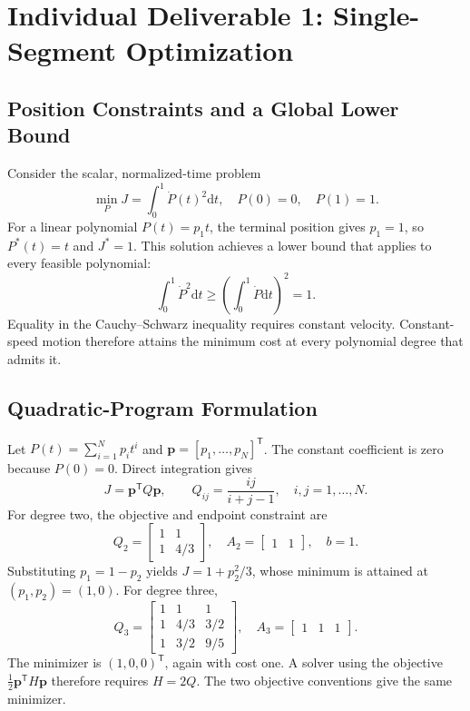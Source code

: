 \documentclass[letterpaper,10pt,conference]{ieeeconf}
\newcommand{\dd}{\mathrm d}
\begin{document}
\section{Individual Deliverable 1: Single-Segment Optimization}
\subsection{Position Constraints and a Global Lower Bound}
Consider the scalar, normalized-time problem
\begin{equation}
\min_P J=\int_0^1\dot P(t)^2\dd t,\quad P(0)=0,\quad P(1)=1.\label{eq:single}
\end{equation}
For a linear polynomial $P(t)=p_1t$, the terminal position gives $p_1=1$, so $P^*(t)=t$ and $J^*=1$.
This solution achieves a lower bound that applies to every feasible polynomial:
\begin{equation}
\int_0^1\dot P^2\dd t\geq\left(\int_0^1\dot P\dd t\right)^2=1.
\end{equation}
Equality in the Cauchy--Schwarz inequality requires constant velocity.
Constant-speed motion therefore attains the minimum cost at every polynomial degree that admits it.
\subsection{Quadratic-Program Formulation}
Let $P(t)=\sum_{i=1}^Np_it^i$ and $\bm p=[p_1,\ldots,p_N]^\mathsf T$.
The constant coefficient is zero because $P(0)=0$.
Direct integration gives
\begin{equation}
J=\bm p^\mathsf TQ\bm p,\qquad Q_{ij}=\frac{ij}{i+j-1},\quad i,j=1,\ldots,N.
\end{equation}
For degree two, the objective and endpoint constraint are
\begin{equation}
Q_2=\begin{bmatrix}1&1\\1&4/3\end{bmatrix},\quad
A_2=\begin{bmatrix}1&1\end{bmatrix},\quad b=1.
\end{equation}
Substituting $p_1=1-p_2$ yields $J=1+p_2^2/3$, whose minimum is attained at $(p_1,p_2)=(1,0)$.
For degree three,
\begin{equation}
Q_3=\begin{bmatrix}1&1&1\\1&4/3&3/2\\1&3/2&9/5\end{bmatrix},\quad
A_3=\begin{bmatrix}1&1&1\end{bmatrix}.
\end{equation}
The minimizer is $(1,0,0)^\mathsf T$, again with cost one.
A solver using the objective $\frac12\bm p^\mathsf TH\bm p$ therefore requires $H=2Q$.
The two objective conventions give the same minimizer.
\end{document}
